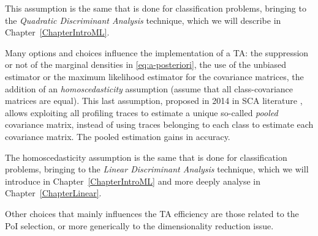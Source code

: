 \begin{remark}This assumption is the same that is done for classification problems, bringing to the \emph{Quadratic Discriminant Analysis} technique, which we will describe in Chapter~\ref{ChapterIntroML}. 
\end{remark}

Many options and choices influence the implementation of a TA: the suppression or not of the marginal densities in \eqref{eq:a-posteriori}, the use of the unbiased estimator or the maximum likelihood estimator for the covariance matrices, the addition of an \emph{homoscedasticity} assumption (assume that all class-covariance matrices are equal). This last assumption, proposed in 2014 in SCA literature \cite{choudary2014efficient},  allows exploiting all profiling traces to estimate a unique so-called \emph{pooled} covariance matrix, instead of using traces belonging to each class to estimate each covariance matrix. The pooled estimation gains in accuracy. 

\begin{remark}
The homoscedasticity assumption is the same that is done for classification problems, bringing to the \emph{Linear Discriminant Analysis} technique, which we will introduce in Chapter~\ref{ChapterIntroML} and more deeply analyse in Chapter~\ref{ChapterLinear}.  
\end{remark}

Other choices that mainly influences the TA efficiency are those related to the PoI selection, or more generically to the dimensionality reduction issue.

